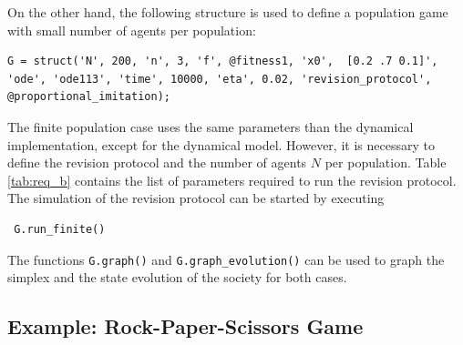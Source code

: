 On the other hand, the following structure is used to define a population game with small number of agents per population:
%
\begin{lstlisting}
G = struct('N', 200, 'n', 3, 'f', @fitness1, 'x0',  [0.2 .7 0.1]', 'ode', 'ode113', 'time', 10000, 'eta', 0.02, 'revision_protocol', @proportional_imitation); 
\end{lstlisting}
%
The finite population case uses the same parameters than the dynamical implementation, except for the dynamical model. However, it is necessary to define the revision protocol  and the number of agents $N$ per population.
Table \ref{tab:req_b} contains the list of parameters required to run the revision protocol. The simulation of the revision protocol can be started by executing
\begin{lstlisting}
 G.run_finite()
\end{lstlisting}

The functions \verb|G.graph()| and \verb|G.graph_evolution()| can be used to graph the simplex and the state evolution of the society for both cases.



\subsection{Example: Rock-Paper-Scissors Game}



